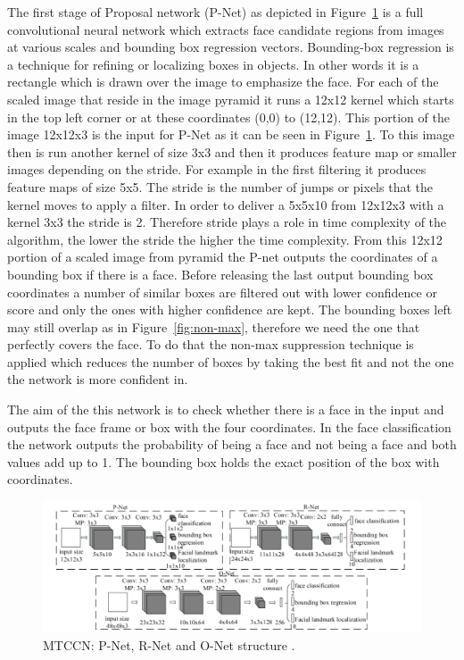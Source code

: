 The first stage of Proposal network (P-Net) as depicted in Figure~\ref{fig:3stages} is a full convolutional neural network which extracts face candidate regions from images at various scales and bounding box regression vectors. Bounding-box regression is a technique for refining or localizing boxes in objects. In other words it is a rectangle which is drawn over the image to emphasize the face. For each of the scaled image that reside in the image pyramid it runs a 12x12 kernel which starts in the top left corner or at these coordinates (0,0) to (12,12). This portion of the image 12x12x3 is the input for P-Net as it can be seen in Figure~\ref{fig:3stages}. To this image then is run another kernel of size 3x3 and then it produces feature map or smaller images depending on the stride. For example in the first filtering it produces feature maps of size 5x5. The stride is the number of jumps or pixels that the kernel moves to apply a filter. In order to deliver a 5x5x10 from 12x12x3 with a kernel 3x3 the stride is 2. Therefore stride plays a role in time complexity of the algorithm, the lower the stride the higher the time complexity. From this 12x12 portion of a scaled image from pyramid the P-net outputs the coordinates of a bounding box if there is a face. Before releasing the last output bounding box coordinates a number of similar boxes are filtered out with lower confidence or score and only the ones with higher confidence are kept. The bounding boxes left may still overlap as in Figure~\ref{fig:non-max}, therefore we need the one that perfectly covers the face. To do that the non-max suppression technique is applied which reduces the number of boxes by taking the best fit and not the one the network is more confident in. 




The aim of the this network is to check whether there is a face in the input and outputs the face frame or box with the four coordinates. In the face classification the network outputs the probability of being a face and not being a face and both values add up to 1. The bounding box holds the exact position of the box with coordinates. 


\begin{figure}[!htb]
    \centering
    \includegraphics[width=1\textwidth]{figures/3stages.png}
    \caption{ MTCCN: P-Net, R-Net and O-Net structure \cite{refmtcnn}.}
    \label{fig:3stages}
\end{figure}


